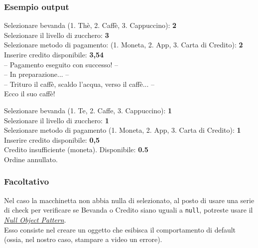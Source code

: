 \documentclass{article}
\begin{document}
\subsubsection*{Esempio output}

\begin{tcolorbox}
    Selezionare bevanda (1. Thè, 2. Caffè, 3. Cappuccino): \textbf{2} \\
    Selezionare il livello di zucchero: \textbf{3} \\
    Selezionare metodo di pagamento: (1. Moneta, 2. App, 3. Carta di Credito): \textbf{2} \\
    Inserire credito disponibile: \textbf{3,54} \\
     -- Pagamento eseguito con successo! --\\
     -- In preparazione... --\\
     -- Trituro il caffè, scaldo l'acqua, verso il caffè... -- \\
    Ecco il suo caffè!
\end{tcolorbox}

\begin{tcolorbox}
    Selezionare bevanda (1. Te, 2. Caffe, 3. Cappuccino): \textbf{1} \\
    Selezionare il livello di zucchero: \textbf{1} \\
    Selezionare metodo di pagamento (1. Moneta, 2. App, 3. Carta di Credito): \textbf{1} \\
    Inserire credito disponibile: \textbf{0,5} \\
    Credito insufficiente (moneta). Disponibile: \textbf{0.5} \\
    Ordine annullato.
\end{tcolorbox}

\subsubsection*{Facoltativo}

Nel caso la macchinetta non abbia nulla di selezionato, al posto di usare una serie di check per verificare se Bevanda o Credito siano uguali a \texttt{null}, potreste usare il \href{https://refactoring.guru/introduce-null-object}{\textit{Null Object Pattern}}. \\
Esso consiste nel creare un oggetto che esibisca il comportamento di default (ossia, nel nostro caso, stampare a video un errore).
\end{document}
